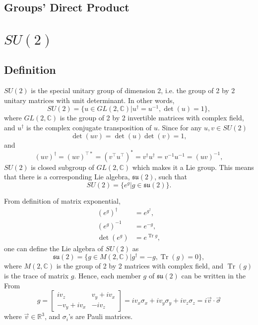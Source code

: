 \documentclass[preprint, 12pt]{revtex4-2}
\DeclareMathOperator{\Tr}{Tr}
\numberwithin{equation}{section}
\begin{document}
\subsection{Groups' Direct Product}


\section{$SU(2)$}

\subsection{Definition}
$SU(2)$ is the special unitary group of dimension 2, i.e. the group of 2 by 2 unitary matrices with unit determinant. In other words,
\begin{equation}
    SU(2) = \{u \in GL(2, \mathbb{C})|u^\dagger=u^{-1}, \det(u) = 1\},
\end{equation}    
where $GL(2,\mathbb{C})$ is the group of 2 by 2 invertible matrices with complex field, and $u^\dagger$ is the complex conjugate transposition of $u$. Since for any $u, v \in SU(2)$
\begin{equation}
    \det(uv) = \det(u)\det(v) = 1,
\end{equation}
and
\begin{equation}
    (uv)^\dagger = (uv)^{\top\ast} = (v^\top u^\top)^\ast = v^\dagger u^\dagger = v^{-1}u^{-1} = (uv)^{-1},
\end{equation}
$SU(2)$ is closed subgroup of $GL(2, \mathbb{C})$ which makes it a Lie group. This means that there is a corresponding Lie algebra, $\mathfrak{su(2)}$, such that 
\begin{equation}
    SU(2) = \{e^g|g \in \mathfrak{su(2)}\}.
\end{equation}

From definition of matrix exponential,
\begin{equation}
    \begin{aligned}
        (e^g)^\dagger &= e^{g^\dagger}, \\
        (e^g)^{-1} &= e^{-g}, \\
        \det(e^g) &= e^{\Tr g},
    \end{aligned}
\end{equation}
one can define the Lie algebra of $SU(2)$ as
\begin{equation}
    \mathfrak{su(2)} = \{g \in M(2, \mathbb{C})|g^\dagger=-g, \Tr(g) = 0\},
\end{equation}
where $M(2,\mathbb{C})$ is the group of 2 by 2 matrices with complex field, and $\Tr(g)$ is the trace of matrix $g$. Hence, each member $g$ of $\mathfrak{su(2)}$ can be written in the From
\begin{equation}
    g = \begin{bmatrix}
            iv_z & v_y+iv_x \\
            -v_y+iv_x & -iv_z
        \end{bmatrix}
      = iv_x\sigma_x + iv_y\sigma_y + iv_z\sigma_z = i\vec{v}\cdot\vec{\sigma}
\end{equation}
where $\vec{v} \in \mathbb{R}^3$, and $\sigma_i$'s are Pauli matrices.
\end{document}
